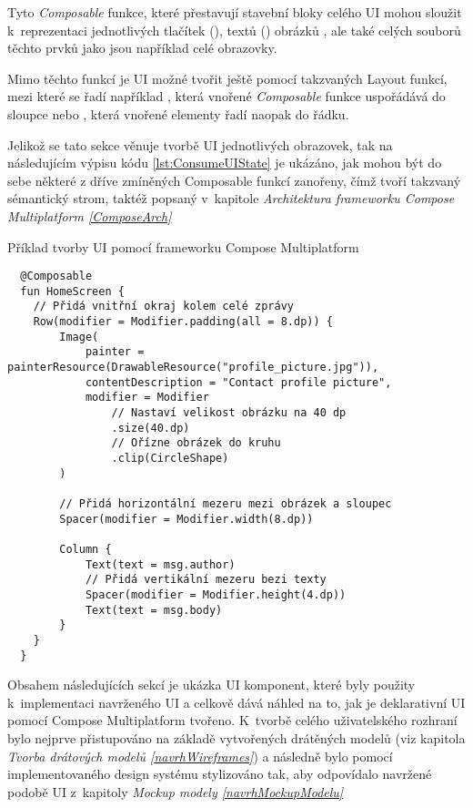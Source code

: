 Tyto \textit{Composable} funkce, které přestavují stavební bloky celého UI mohou sloužit k~reprezentaci jednotlivých tlačítek (), 
textů () obrázků , ale také celých souborů těchto prvků jako jsou například celé obrazovky.

Mimo těchto funkcí je UI možné tvořit ještě pomocí takzvaných Layout funkcí, mezi které se řadí například , která vnořené \textit{Composable}
funkce uspořádává do sloupce nebo , která vnořené elementy řadí naopak do řádku.

Jelikož se tato sekce věnuje tvorbě UI jednotlivých obrazovek, tak na následujícím výpisu kódu \ref{lst:ConsumeUIState} je ukázáno, jak mohou
 být do sebe některé z dříve zmíněných Composable funkcí zanořeny, čímž tvoří takzvaný sémantický strom, taktéž popsaný v~kapitole 
 \textit{Architektura frameworku Compose Multiplatform \ref{ComposeArch}}

\begin{listing}[H]
\caption{Příklad tvorby UI pomocí frameworku Compose Multiplatform}\label{lst:ConsumeUIState}
\begin{verbatim}
  @Composable
  fun HomeScreen {
    // Přidá vnitřní okraj kolem celé zprávy
    Row(modifier = Modifier.padding(all = 8.dp)) {
        Image(
            painter = painterResource(DrawableResource("profile_picture.jpg")),
            contentDescription = "Contact profile picture",
            modifier = Modifier
                // Nastaví velikost obrázku na 40 dp
                .size(40.dp)
                // Ořízne obrázek do kruhu
                .clip(CircleShape)
        )

        // Přidá horizontální mezeru mezi obrázek a sloupec
        Spacer(modifier = Modifier.width(8.dp))

        Column {
            Text(text = msg.author)
            // Přidá vertikální mezeru bezi texty
            Spacer(modifier = Modifier.height(4.dp))
            Text(text = msg.body)
        }
    }
  }
\end{verbatim}
\end{listing}



Obsahem následujících sekcí je ukázka UI komponent, které byly použity k~implementaci navrženého UI a celkově dává náhled na to,
jak je deklarativní UI pomocí Compose Multiplatform tvořeno. K~tvorbě celého uživatelského rozhraní bylo nejprve přistupováno na základě vytvořených 
drátěných modelů (viz kapitola \textit{Tvorba drátových modelů \ref{navrhWireframes}}) a následně bylo pomocí implementovaného design systému
stylizováno tak, aby odpovídalo navržené podobě UI z~kapitoly \textit{Mockup modely \ref{navrhMockupModelu}}

